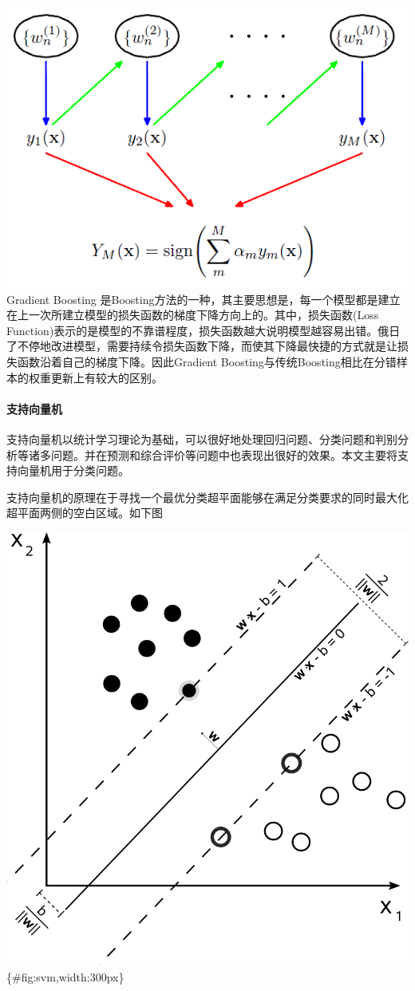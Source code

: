 \includegraphics{./images/boosting.png} Gradient Boosting
是Boosting方法的一种，其主要思想是，每一个模型都是建立在上一次所建立模型的损失函数的梯度下降方向上的。其中，损失函数(Loss
Function)表示的是模型的不靠谱程度，损失函数越大说明模型越容易出错。俄日了不停地改进模型，需要持续令损失函数下降，而使其下降最快捷的方式就是让损失函数沿着自己的梯度下降。因此Gradient
Boosting与传统Boosting相比在分错样本的权重更新上有较大的区别。

\paragraph{支持向量机}\label{ux652fux6301ux5411ux91cfux673a}

支持向量机以统计学习理论为基础，可以很好地处理回归问题、分类问题和判别分析等诸多问题。并在预测和综合评价等问题中也表现出很好的效果。本文主要将支持向量机用于分类问题。

支持向量机的原理在于寻找一个最优分类超平面能够在满足分类要求的同时最大化超平面两侧的空白区域。如下图

\includegraphics{./images/svm.png}\{\#fig:svm,width:300px\}

